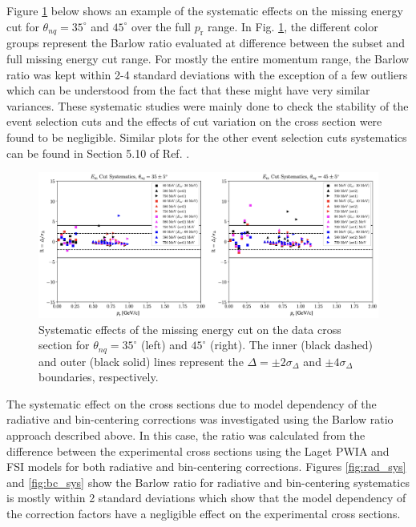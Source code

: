 \documentclass[aps, prl]{revtex4-2}  %
\begin{document}
\indent Figure \ref{fig:Em_sys} below shows an example of the systematic effects on the missing energy cut for $\theta_{nq}=35^{\circ}$ and $45^{\circ}$ over the full $p_{\mathrm{r}}$ range.
In Fig. \ref{fig:Em_sys}, the different color groups represent the Barlow ratio evaluated at difference between the subset and full missing energy cut range. For mostly the entire momentum range,
the Barlow ratio was kept within 2-4 standard deviations with the exception of a few outliers which can be understood from the fact that these might have very similar variances. These systematic
studies were mainly done to check the stability of the event selection cuts and the effects of cut variation on the cross section were found to be negligible. Similar plots for the other event selection
cuts systematics can be found in Section 5.10 of Ref. \cite{cyero_phdthesis}. 
\clearpage
\begin{figure}[!ht]
\includegraphics[scale=0.4]{plots/Em_syst.png}
\caption{Systematic effects of the missing energy cut on the data cross section for $\theta_{nq}=35^{\circ}$ (left) and $45^{\circ}$ (right). The inner (black dashed) and outer (black solid)
  lines represent the $\Delta=\pm2\sigma_{\Delta}$ and $\pm4\sigma_{\Delta}$ boundaries, respectively.}
\label{fig:Em_sys}
\end{figure}
\indent The systematic effect on the cross sections due to model dependency of the radiative and bin-centering corrections was investigated
using the Barlow ratio approach described above. In this case, the ratio was calculated from the difference between the experimental cross
sections using the Laget PWIA and FSI models for both radiative and bin-centering corrections. Figures \ref{fig:rad_sys} and \ref{fig:bc_sys}
show the Barlow ratio for radiative and bin-centering systematics is mostly within 2 standard deviations which show that
the model dependency of the correction factors have a negligible effect on the experimental cross sections.
\end{document}
